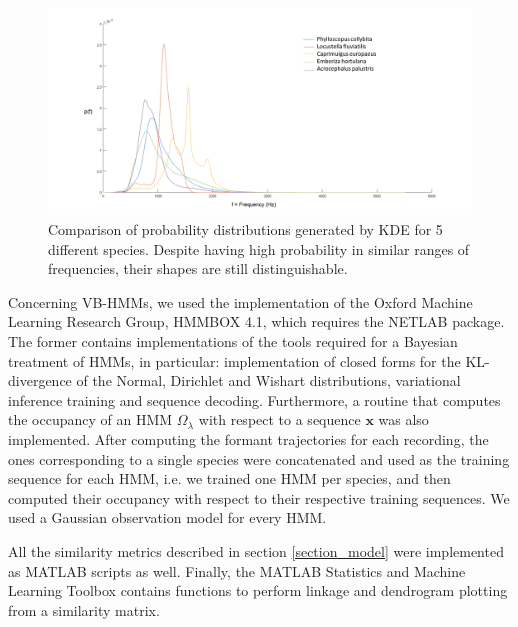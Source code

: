 \documentclass[pdftex,11pt,a4paper]{article}
\theoremstyle{definition}
\theoremstyle{remark}
\newcommand*{\V}[1]{\mathbf{#1}}%
\begin{document}
\begin{figure}[t]
\centering
\includegraphics[width=\textwidth]{images/kdespecies}
\caption{Comparison of probability distributions generated by KDE for 5 different species. Despite having high probability in similar ranges of frequencies, their shapes are still distinguishable. }
\label{fig_kdespecies}
\end{figure}
\par Concerning VB-HMMs, we used the implementation of the Oxford Machine Learning Research Group, HMMBOX 4.1, which requires the NETLAB package. The former contains implementations of the tools required for a Bayesian treatment of HMMs, in particular: implementation of closed forms for the KL-divergence of the Normal, Dirichlet and Wishart distributions, variational inference training and sequence decoding. Furthermore, a routine that computes the occupancy of an HMM $\Omega_\lambda$ with respect to a sequence $\V{x}$ was also implemented. After computing the formant trajectories for each recording, the ones corresponding to a single species were concatenated and used as the training sequence for each HMM, i.e. we trained one HMM per species, and then computed their occupancy with respect to their respective training sequences. We used a Gaussian observation model for every HMM.
\par All the similarity metrics described in section \ref{section_model} were implemented as MATLAB scripts as well. Finally, the MATLAB Statistics and Machine Learning Toolbox contains functions to perform linkage and dendrogram plotting from a similarity matrix.
\end{document}
